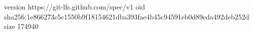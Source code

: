 version https://git-lfs.github.com/spec/v1
oid sha256:1e866273c5c1550b9f18154621dba393fae4b45c94591eb0d89eda492deb252d
size 174940

